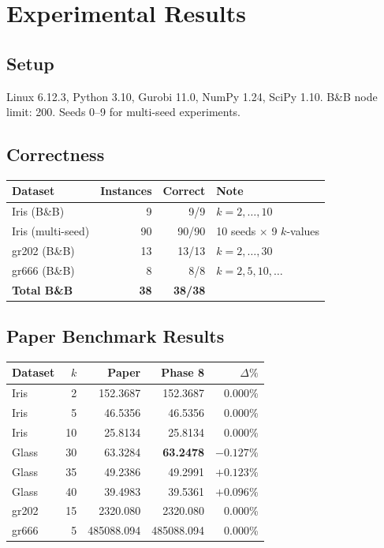 \documentclass[12pt,a4paper]{article}
\begin{document}
\section{Experimental Results}
\label{sec:results}

\subsection{Setup}

Linux 6.12.3, Python 3.10, Gurobi 11.0, NumPy 1.24, SciPy 1.10. B\&B node limit: 200. Seeds 0--9 for multi-seed experiments.

\subsection{Correctness}

\begin{center}
\begin{tabular}{lrrl}
\toprule
Dataset & Instances & Correct & Note \\
\midrule
Iris (B\&B) & 9 & 9/9 & $k=2,\ldots,10$ \\
Iris (multi-seed) & 90 & 90/90 & 10 seeds $\times$ 9 $k$-values \\
gr202 (B\&B) & 13 & 13/13 & $k=2,\ldots,30$ \\
gr666 (B\&B) & 8 & 8/8 & $k=2,5,10,\ldots$ \\
\midrule
\textbf{Total B\&B} & \textbf{38} & \textbf{38/38} & \\
\bottomrule
\end{tabular}
\end{center}

\subsection{Paper Benchmark Results}

\begin{center}
\begin{tabular}{lrrrr}
\toprule
Dataset & $k$ & Paper & Phase 8 & $\Delta\%$ \\
\midrule
Iris & 2 & 152.3687 & 152.3687 & 0.000\% \\
Iris & 5 & 46.5356 & 46.5356 & 0.000\% \\
Iris & 10 & 25.8134 & 25.8134 & 0.000\% \\
Glass & 30 & 63.3284 & \textbf{63.2478} & $-0.127\%$ \\
Glass & 35 & 49.2386 & 49.2991 & $+0.123\%$ \\
Glass & 40 & 39.4983 & 39.5361 & $+0.096\%$ \\
gr202 & 15 & 2320.080 & 2320.080 & 0.000\% \\
gr666 & 5 & 485088.094 & 485088.094 & 0.000\% \\
\bottomrule
\end{tabular}
\end{center}
\end{document}
